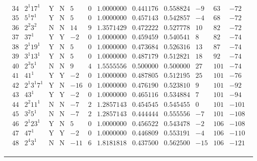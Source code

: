 \documentclass[11pt,reqno,a4letter]{article}
\numberwithin{figure}{section}
\numberwithin{table}{section}
\theoremstyle{plain}
\numberwithin{theorem}{section}
\theoremstyle{definition}
\begin{document}
\begin{table}[ht!]
\begin{equation*}
{\begin{array}{cc|cc|ccc|cc|ccc}
 34 & 2^1 17^1 & \text{Y} & \text{N} & 5 & 0 & 1.0000000 & 0.441176 & 0.558824 & -9 & 63 & -72 \\
 35 & 5^1 7^1 & \text{Y} & \text{N} & 5 & 0 & 1.0000000 & 0.457143 & 0.542857 & -4 & 68 & -72 \\
 36 & 2^2 3^2 & \text{N} & \text{N} & 14 & 9 & 1.3571429 & 0.472222 & 0.527778 & 10 & 82 & -72 \\
 37 & 37^1 & \text{Y} & \text{Y} & -2 & 0 & 1.0000000 & 0.459459 & 0.540541 & 8 & 82 & -74 \\
 38 & 2^1 19^1 & \text{Y} & \text{N} & 5 & 0 & 1.0000000 & 0.473684 & 0.526316 & 13 & 87 & -74 \\
 39 & 3^1 13^1 & \text{Y} & \text{N} & 5 & 0 & 1.0000000 & 0.487179 & 0.512821 & 18 & 92 & -74 \\
 40 & 2^3 5^1 & \text{N} & \text{N} & 9 & 4 & 1.5555556 & 0.500000 & 0.500000 & 27 & 101 & -74 \\
 41 & 41^1 & \text{Y} & \text{Y} & -2 & 0 & 1.0000000 & 0.487805 & 0.512195 & 25 & 101 & -76 \\
 42 & 2^1 3^1 7^1 & \text{Y} & \text{N} & -16 & 0 & 1.0000000 & 0.476190 & 0.523810 & 9 & 101 & -92 \\
 43 & 43^1 & \text{Y} & \text{Y} & -2 & 0 & 1.0000000 & 0.465116 & 0.534884 & 7 & 101 & -94 \\
 44 & 2^2 11^1 & \text{N} & \text{N} & -7 & 2 & 1.2857143 & 0.454545 & 0.545455 & 0 & 101 & -101 \\
 45 & 3^2 5^1 & \text{N} & \text{N} & -7 & 2 & 1.2857143 & 0.444444 & 0.555556 & -7 & 101 & -108 \\
 46 & 2^1 23^1 & \text{Y} & \text{N} & 5 & 0 & 1.0000000 & 0.456522 & 0.543478 & -2 & 106 & -108 \\
 47 & 47^1 & \text{Y} & \text{Y} & -2 & 0 & 1.0000000 & 0.446809 & 0.553191 & -4 & 106 & -110 \\
 48 & 2^4 3^1 & \text{N} & \text{N} & -11 & 6 & 1.8181818 & 0.437500 & 0.562500 & -15 & 106 & -121 \\ 
\end{array}
}
\end{equation*}

\bigskip\hrule\smallskip 


\end{table}
\end{document}
